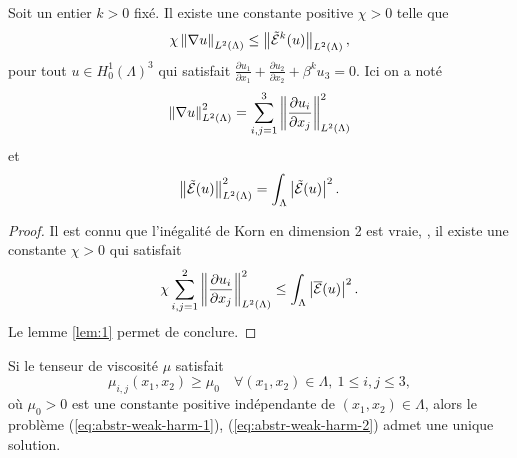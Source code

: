 \begin{lemme}\label{lem:2}
  Soit un entier $k > 0$ fixé. Il existe une constante positive $\chi >
  0$ telle que
  \begin{equation}
\chi \left\lVert \nabla u \right\rVert_{L^2(\Lambda)} \leq
\left\lVert \tilde{\mathcal E}^k(u) \right\rVert_{L^2(\Lambda)},
  \end{equation}
  pour tout $u \in H^1_0(\Lambda)^3$ qui satisfait $\frac{\partial
    u_1}{\partial x_1} + \frac{\partial u_2}{\partial x_2} +
  \beta^k u_3 = 0$. Ici on a noté
  \begin{equation}
    \left\lVert \nabla u \right\rVert_{L^2(\Lambda)}^2 = \sum_{i,j = 1}^3 \left\lVert \frac{\partial u_i}{\partial x_j} \right\rVert^2_{L^2(\Lambda)}
  \end{equation}
  et
  \begin{equation}
    \left\lVert \tilde{\mathcal E}(u) \right\rVert^2_{L^2(\Lambda)} = \int_\Lambda \left\lvert \tilde{\mathcal E}(u) \right\rvert^2.
  \end{equation}
\end{lemme}

\begin{proof}
Il est connu que l'inégalité de Korn en dimension 2 est vraie, \ie, il
existe une constante $\chi > 0$ qui satisfait
\begin{equation}
\chi\sum_{i,j = 1}^2 \left\lVert \frac{\partial u_i}{\partial
    x_j} \right\rVert^2_{L^2(\Lambda)} \leq \int_\Lambda \left\lvert \overline{\mathcal E}(u) \right\rvert^2.
\end{equation}
Le lemme \ref{lem:1} permet de conclure.
\end{proof}

\begin{proposition}\label{prop:2}
  Si le tenseur de viscosité $\mu$ satisfait
\begin{equation}
  \mu_{i,j}(x_1,x_2) \geq \mu_0\quad \forall (x_1, x_2)\in \Lambda,\ 1
  \leq i,j \leq 3,\label{eq:hypothesis}
\end{equation}
où $\mu_0 > 0$ est une constante positive indépendante de $(x_1,
x_2)\in \Lambda$, alors le problème (\ref{eq:abstr-weak-harm-1}),
(\ref{eq:abstr-weak-harm-2}) admet une unique solution.
\end{proposition}

